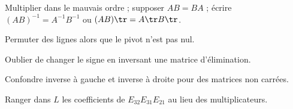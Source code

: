 \begin{erreurs}
\item Multiplier dans le mauvais ordre ; supposer $AB=BA$ ; écrire $(AB)^{-1}=A^{-1}B^{-1}$ ou $(AB)\tr=A\tr B\tr$.
\item Permuter des lignes alors que le pivot n'est pas nul.
\item Oublier de changer le signe en inversant une matrice d'élimination.
\item Confondre inverse à gauche et inverse à droite pour des matrices non carrées.
\item Ranger dans $L$ les coefficients de $E_{32}E_{31}E_{21}$ au lieu des multiplicateurs.
\end{erreurs}

\exercices



